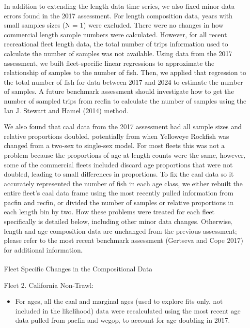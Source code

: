 \documentclass[
]{scrartcl}
\makeatletter
\let\oldparagraph\paragraph
\renewcommand{\paragraph}{
    \@ifstar
      \xxxParagraphStar
      \xxxParagraphNoStar
  }
\newcommand{\xxxParagraphStar}[1]{\oldparagraph*{#1}\mbox{}}
\newcommand{\xxxParagraphNoStar}[1]{\oldparagraph{#1}\mbox{}}
\providecommand{\tightlist}{%
  \setlength{\itemsep}{0pt}\setlength{\parskip}{0pt}}\usepackage{longtable,booktabs,array}
\makeatother
\begin{document}
In addition to extending the length data time series, we also fixed
minor data errors found in the 2017 assessment. For length composition
data, years with small samples sizes (N = 1) were excluded. There were
no changes in how commercial length sample numbers were calculated.
However, for all recent recreational fleet length data, the total number
of trips information used to calculate the number of samples was not
available. Using data from the 2017 assessment, we built fleet-specific
linear regressions to approximate the relationship of samples to the
number of fish. Then, we applied that regression to the total number of
fish for data between 2017 and 2024 to estimate the number of samples. A
future benchmark assessment should investigate how to get the number of
sampled trips from \gls{recfin} to calculate the number of samples using
the Ian J. Stewart and Hamel (2014) method.

We also found that \gls{caal} data from the 2017 assessment had all
sample sizes and relative proportions doubled, potentially from when
Yelloweye Rockfish was changed from a two-sex to single-sex model. For
most fleets this was not a problem because the proportions of
age-at-length counts were the same, however, some of the commercial
fleets included discard age proportions that were not doubled, leading
to small differences in proportions. To fix the \gls{caal} data so it
accurately represented the number of fish in each age class, we either
rebuilt the entire fleet's \gls{caal} data frame using the most recently
pulled information from \gls{pacfin} and \gls{recfin}, or divided the
number of samples or relative proportions in each length bin by two. How
these problems were treated for each fleet specifically is detailed
below, including other minor data changes. Otherwise, length and age
composition data are unchanged from the previous assessment; please
refer to the most recent benchmark assessment (Gertseva and Cope 2017)
for additional information.

\paragraph{Fleet Specific Changes in the Compositional
Data}\label{fleet-specific-changes-in-the-compositional-data}

Fleet 2. California Non-Trawl:

\begin{itemize}
\tightlist
\item
  For ages, all the \gls{caal} and marginal ages (used to explore fits
  only, not included in the likelihood) data were recalculated using the
  most recent age data pulled from \gls{pacfin} and \gls{wcgop}, to
  account for age doubling in 2017.
\end{itemize}
\end{document}
